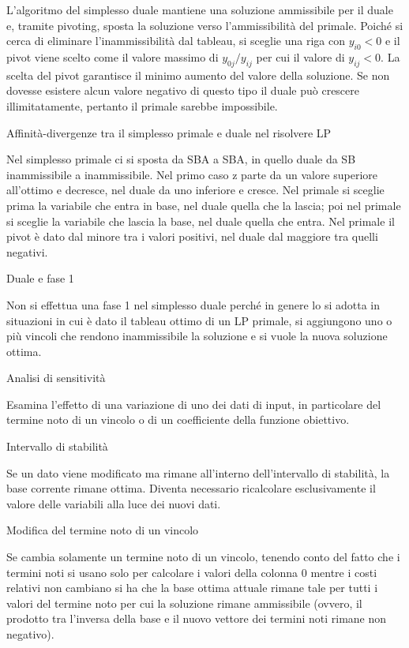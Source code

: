 \documentclass[answers, a4paper, 11pt]{exam}
\begin{document}
\begin{questions}
\begin{solution}
L'algoritmo del simplesso duale mantiene una soluzione ammissibile per il duale e, tramite pivoting, sposta la soluzione verso l'ammissibilità del primale. Poiché si cerca di eliminare l'inammissibilità dal tableau, si sceglie una riga con $y_{i0}<0$ e il pivot viene scelto come il valore massimo di $y_{0j}/y_{ij}$ per cui il valore di $y_{ij}<0$. La scelta del pivot garantisce il minimo aumento del valore della soluzione. Se non dovesse esistere alcun valore negativo di questo tipo il duale può crescere illimitatamente, pertanto il primale sarebbe impossibile.
\end{solution}
\question Affinità-divergenze tra il simplesso primale e duale nel risolvere LP 
\begin{solution}
Nel simplesso primale ci si sposta da SBA a SBA, in quello duale da SB inammissibile a inammissibile. Nel primo caso z parte da un valore superiore all'ottimo e decresce, nel duale da uno inferiore e cresce. Nel primale si sceglie prima la variabile che entra in base, nel duale quella che la lascia; poi nel primale si sceglie la variabile che lascia la base, nel duale quella che entra. Nel primale il pivot è dato dal minore tra i valori positivi, nel duale dal maggiore tra quelli negativi.
\end{solution}
\question Duale e fase 1
\begin{solution}
Non si effettua una fase 1 nel simplesso duale perché in genere lo si adotta in situazioni in cui è dato il tableau ottimo di un LP primale, si aggiungono uno o più vincoli che rendono inammissibile la soluzione e si vuole la nuova soluzione ottima.
\end{solution}
\question Analisi di sensitività
\begin{solution}
Esamina l'effetto di una variazione di uno dei dati di input, in particolare del termine noto di un vincolo o di un coefficiente della funzione obiettivo.
\end{solution}
\question Intervallo di stabilità
\begin{solution}
Se un dato viene modificato ma rimane all'interno dell'intervallo di stabilità, la base corrente rimane ottima. Diventa necessario ricalcolare esclusivamente il valore delle variabili alla luce dei nuovi dati.
\end{solution}
\question Modifica del termine noto di un vincolo
\begin{solution}
Se cambia solamente un termine noto di un vincolo, tenendo conto del fatto che i termini noti si usano solo per calcolare i valori della colonna 0 mentre i costi relativi non cambiano si ha che la base ottima attuale rimane tale per tutti i valori del termine noto per cui la soluzione rimane ammissibile (ovvero, il prodotto tra l'inversa della base e il nuovo vettore dei termini noti rimane non negativo). 

\end{solution}
\end{questions}
\end{document}
